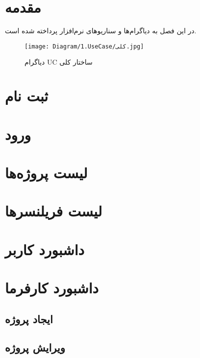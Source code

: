 


\section*{مقدمه}
در این فصل به دیاگرام‌ها و سناریوهای نرم‌افزار پرداخته شده است.
\begin{figure}[H]
	\centering
	\texttt{[image: Diagram/1.UseCase/کلی.jpg]}
	\caption{دیاگرام UC ساختار کلی}
	\label{fig:uc:ساختار-کلی}
\end{figure}

\section{‌ثبت نام}


\section{ورود}


\section{لیست پروژه‌ها}


\section{لیست فریلنسرها}



\section{داشبورد کاربر}


\section{داشبورد کارفرما}


\subsection{ایجاد پروژه}


\subsection{ویرایش پروژه}


